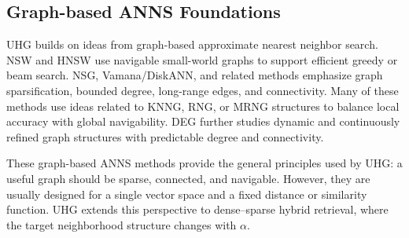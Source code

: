 \subsection{Graph-based ANNS Foundations}

UHG builds on ideas from graph-based approximate nearest neighbor search. NSW and HNSW use navigable small-world graphs to support efficient greedy or beam search. NSG, Vamana/DiskANN, and related methods emphasize graph sparsification, bounded degree, long-range edges, and connectivity. Many of these methods use ideas related to KNNG, RNG, or MRNG structures to balance local accuracy with global navigability. DEG further studies dynamic and continuously refined graph structures with predictable degree and connectivity.

These graph-based ANNS methods provide the general principles used by UHG: a useful graph should be sparse, connected, and navigable. However, they are usually designed for a single vector space and a fixed distance or similarity function. UHG extends this perspective to dense--sparse hybrid retrieval, where the target neighborhood structure changes with $\alpha$.

